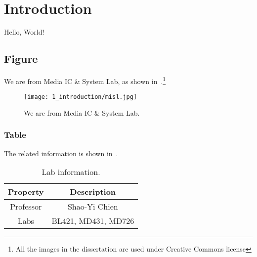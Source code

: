 \chapter{Introduction}
\label{ch:intro}
Hello, World!

\section{Figure}
\label{sec:figure}
We are from Media IC \& System Lab, as shown in~.\footnote{All the images in the dissertation are used under Creative Commons license}


\begin{figure}
\begin{center}
\texttt{[image: 1\_introduction/misl.jpg]}
\end{center}
\caption{
We are from Media IC \& System Lab.
}
\label{fig:misl}
\end{figure}


\subsection{Table}
\label{sec:picture}
The related information is shown in~.

\begin{table}[p]
\caption{Lab information.}
\label{tab:lab_information}
\centering
\footnotesize 
\begin{tabular}{cc}
\toprule
Property & Description \\
\midrule
Professor & Shao-Yi Chien \\
Labs & BL421, MD431, MD726 \\
\bottomrule
\end{tabular}
\end{table}
